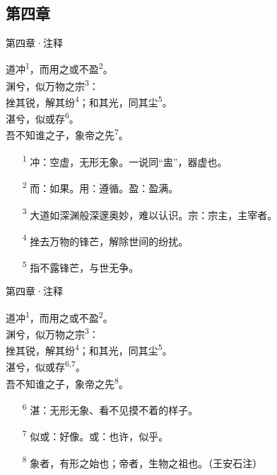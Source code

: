 \documentclass{beamer}
\newcommand{\classical}[1]{\textcolor{classical}{\kaishu #1}}         %
\newcommand{\notation}[1]{\textsuperscript{\textcolor{notemark}{\small #1}}} %
\newcommand{\originaltext}[1]{
	\begin{center}
		\large\classical{#1}
	\end{center}
	}
\begin{document}
\subsection{第四章}
\begin{frame}{第四章·注释}
	\originaltext{
	道冲\notation{1}，而用之或不盈\notation{2}。\\
	渊兮，似万物之宗\notation{3}：\\
	挫其锐，解其纷\notation{4}；和其光，同其尘\notation{5}。\\
	湛兮，似或存\notation{6}。\\
	吾不知谁之子，象帝之先\notation{7}。
	}
	\begin{itemize}
		\item[\notation{1}] 冲：空虚，无形无象。一说同“盅”，器虚也。
		\item[\notation{2}] 而：如果。用：遵循。盈：盈满。
		\item[\notation{3}] 大道如深渊般深邃奥妙，难以认识。宗：宗主，主宰者。
		\item[\notation{4}] 挫去万物的锋芒，解除世间的纷扰。
		\item[\notation{5}] 指不露锋芒，与世无争。
	\end{itemize}
\end{frame}
\begin{frame}{第四章·注释}
	\originaltext{
	道冲\notation{1}，而用之或不盈\notation{2}。\\
	渊兮，似万物之宗\notation{3}：\\
	挫其锐，解其纷\notation{4}；和其光，同其尘\notation{5}。\\
	湛兮，似或存\notation{6,7}。\\
	吾不知谁之子，象帝之先\notation{8}。
	}
	\begin{itemize}
		\item[\notation{6}] 湛：无形无象、看不见摸不着的样子。
		\item[\notation{7}] 似或：好像。或：也许，似乎。
		\item[\notation{8}] 象者，有形之始也；帝者，生物之祖也。（王安石注）
    \end{itemize}
\end{frame}
\end{document}
